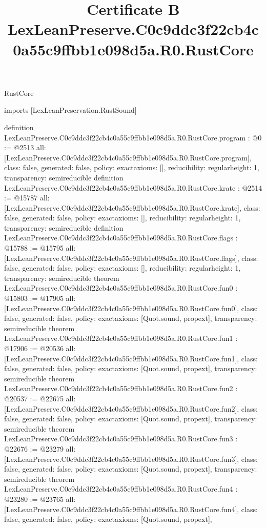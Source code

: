 \begin{lexlean}{RustCore}
\title{Certificate B LexLeanPreserve.C0c9ddc3f22cb4c0a55c9ffbb1e098d5a.R0.RustCore}
\begin{coremodule}
imports [LexLeanPreservation.RustSound]

definition LexLeanPreserve.C0c9ddc3f22cb4c0a55c9ffbb1e098d5a.R0.RustCore.program : @0 := @2513 {
  all: [LexLeanPreserve.C0c9ddc3f22cb4c0a55c9ffbb1e098d5a.R0.RustCore.program],
  class: false,
  generated: false,
  policy: exact{axioms: []},
  reducibility: regular{height: 1},
  transparency: semireducible
}
definition LexLeanPreserve.C0c9ddc3f22cb4c0a55c9ffbb1e098d5a.R0.RustCore.krate : @2514 := @15787 {
  all: [LexLeanPreserve.C0c9ddc3f22cb4c0a55c9ffbb1e098d5a.R0.RustCore.krate],
  class: false,
  generated: false,
  policy: exact{axioms: []},
  reducibility: regular{height: 1},
  transparency: semireducible
}
definition LexLeanPreserve.C0c9ddc3f22cb4c0a55c9ffbb1e098d5a.R0.RustCore.flags : @15788 := @15795 {
  all: [LexLeanPreserve.C0c9ddc3f22cb4c0a55c9ffbb1e098d5a.R0.RustCore.flags],
  class: false,
  generated: false,
  policy: exact{axioms: []},
  reducibility: regular{height: 1},
  transparency: semireducible
}
theorem LexLeanPreserve.C0c9ddc3f22cb4c0a55c9ffbb1e098d5a.R0.RustCore.fun0 : @15803 := @17905 {
  all: [LexLeanPreserve.C0c9ddc3f22cb4c0a55c9ffbb1e098d5a.R0.RustCore.fun0],
  class: false,
  generated: false,
  policy: exact{axioms: [Quot.sound, propext]},
  transparency: semireducible
}
theorem LexLeanPreserve.C0c9ddc3f22cb4c0a55c9ffbb1e098d5a.R0.RustCore.fun1 : @17906 := @20536 {
  all: [LexLeanPreserve.C0c9ddc3f22cb4c0a55c9ffbb1e098d5a.R0.RustCore.fun1],
  class: false,
  generated: false,
  policy: exact{axioms: [Quot.sound, propext]},
  transparency: semireducible
}
theorem LexLeanPreserve.C0c9ddc3f22cb4c0a55c9ffbb1e098d5a.R0.RustCore.fun2 : @20537 := @22675 {
  all: [LexLeanPreserve.C0c9ddc3f22cb4c0a55c9ffbb1e098d5a.R0.RustCore.fun2],
  class: false,
  generated: false,
  policy: exact{axioms: [Quot.sound, propext]},
  transparency: semireducible
}
theorem LexLeanPreserve.C0c9ddc3f22cb4c0a55c9ffbb1e098d5a.R0.RustCore.fun3 : @22676 := @23279 {
  all: [LexLeanPreserve.C0c9ddc3f22cb4c0a55c9ffbb1e098d5a.R0.RustCore.fun3],
  class: false,
  generated: false,
  policy: exact{axioms: [Quot.sound, propext]},
  transparency: semireducible
}
theorem LexLeanPreserve.C0c9ddc3f22cb4c0a55c9ffbb1e098d5a.R0.RustCore.fun4 : @23280 := @23765 {
  all: [LexLeanPreserve.C0c9ddc3f22cb4c0a55c9ffbb1e098d5a.R0.RustCore.fun4],
  class: false,
  generated: false,
  policy: exact{axioms: [Quot.sound, propext]},
}
\end{coremodule}
\end{lexlean}
